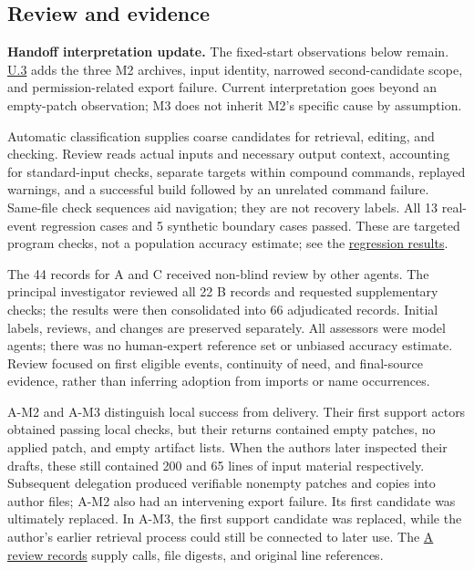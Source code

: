 \subsection[Review and evidence]{\texorpdfstring{\protect\hypertarget{s3}{}Review and evidence}{Review and evidence}}
\textbf{Handoff interpretation update.} The fixed-start observations below remain. \hyperlink{u3}{U.3} adds the three M2 archives, input identity, narrowed second-candidate scope, and permission-related export failure. Current interpretation goes beyond an empty-patch observation; M3 does not inherit M2's specific cause by assumption.

Automatic classification supplies coarse candidates for retrieval, editing, and checking. Review reads actual inputs and necessary output context, accounting for standard-input checks, separate targets within compound commands, replayed warnings, and a successful build followed by an unrelated command failure. Same-file check sequences aid navigation; they are not recovery labels. All 13 real-event regression cases and 5 synthetic boundary cases passed. These are targeted program checks, not a population accuracy estimate; see the \href{research/review/code_audit/regression_results.json}{regression results}.

The 44 records for A and C received non-blind review by other agents. The principal investigator reviewed all 22 B records and requested supplementary checks; the results were then consolidated into 66 adjudicated records. Initial labels, reviews, and changes are preserved separately. All assessors were model agents; there was no human-expert reference set or unbiased accuracy estimate. Review focused on first eligible events, continuity of need, and final-source evidence, rather than inferring adoption from imports or name occurrences.

A-M2 and A-M3 distinguish local success from delivery. Their first support actors obtained passing local checks, but their returns contained empty patches, no applied patch, and empty artifact lists. When the authors later inspected their drafts, these still contained 200 and 65 lines of input material respectively. Subsequent delegation produced verifiable nonempty patches and copies into author files; A-M2 also had an intervening export failure. Its first candidate was ultimately replaced. In A-M3, the first support candidate was replaced, while the author's earlier retrieval process could still be connected to later use. The \href{research/semantic/review_A.json}{A review records} supply calls, file digests, and original line references.

